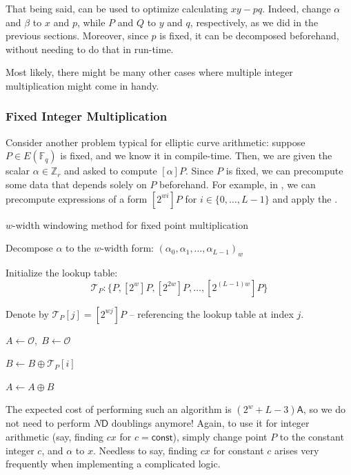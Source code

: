 \documentclass{iacrtrans}
\begin{document}
That being said,  can be used to optimize calculating $xy-pq$. Indeed, change $\alpha$ and $\beta$ to $x$ and $p$, while $P$ and $Q$ to $y$ and $q$, respectively, as we did in the previous sections. Moreover, since $p$ is fixed, it can be decomposed beforehand, without needing to do that in run-time. 

Most likely, there might be many other cases where multiple integer multiplication might come in handy.

\subsubsection{Fixed Integer Multiplication}

Consider another problem typical for elliptic curve arithmetic: suppose $P \in E(\mathbb{F}_q)$ is fixed, and we know it in compile-time. Then, we are given the scalar $\alpha \in \mathbb{Z}_r$ and asked to compute $[\alpha]P$. Since $P$ is fixed, we can precompute some data that depends solely on $P$ beforehand. For example, in , we can precompute expressions of a form $[2^{wi}]P$ for $i \in \{0,\dots,L-1\}$ and apply the . 

\begin{algorithm}
\caption{$w$-width windowing method for fixed point multiplication}


Decompose $\alpha$ to the $w$-width form: $(\alpha_0,\alpha_1,\dots,\alpha_{L-1})_w$

Initialize the lookup table:
\begin{equation}
    \mathcal{T}_P: \{P, [2^w]P, [2^{2w}]P,\dots,[2^{(L-1)w}]P\}
\end{equation}

Denote by $\mathcal{T}_P[j] = [2^{wj}]P$ -- referencing the lookup table at index $j$.

$A \gets \mathcal{O}, \; B \gets \mathcal{O}$

 {
     {
        $B \gets B \oplus \mathcal{T}_P[i]$
    }

    $A \gets A \oplus B$
}

\label{alg:fixed_point_mul}
\end{algorithm}

The expected cost of performing such an algorithm is $(2^w+L-3)\mathsf{A}$, so we do not need to perform $N\mathsf{D}$ doublings anymore! Again, to use it for integer arithmetic (say, finding $cx$ for $c=\mathsf{const}$), simply change point $P$ to the constant integer $c$, and $\alpha$ to $x$. Needless to say, finding $cx$ for constant $c$ arises very frequently when implementing a complicated logic.
\end{document}
